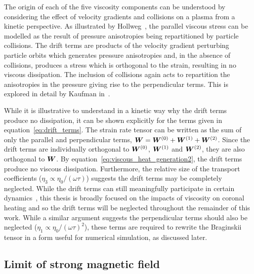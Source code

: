 The origin of each of the five viscosity components can be understood by considering the effect of velocity gradients and collisions on a plasma from a kinetic perspective. As illustrated by Hollweg~\cite{hollwegViscosityMagnetizedPlasma1985}, the parallel viscous stress can be modelled as the result of pressure anisotropies being repartitioned by particle collisions. The drift terms are products of the velocity gradient perturbing particle orbits which generates pressure anisotropies and, in the absence of collisions, produces a stress which is orthogonal to the strain, resulting in no viscous dissipation. The inclusion of collisions again acts to repartition the anisotropies in the pressure giving rise to the perpendicular terms. This is explored in detail by Kaufman in~\cite{kaufmanPlasmaViscosityMagnetic1960}.

While it is illustrative to understand in a kinetic way why the drift terms produce no dissipation, it can be shown explicitly for the terms given in equation~\ref{eq:drift_terms}. The strain rate tensor can be written as the sum of only the parallel and perpendicular terms, ${\bm W} = {\bm W}^{(0)} + {\bm W}^{(1)} + {\bm W}^{(2)}$. Since the drift terms are individually orthogonal to ${\bm W}^{(0)}$, ${\bm W}^{(1)}$ and ${\bm W}^{(2)}$, they are also orthogonal to ${\bm W}$. By equation~\ref{eq:viscous_heat_generation2}, the drift terms produce no viscous dissipation. Furthermore, the relative size of the transport coefficients ($\eta_3 \propto \eta_0/(\omega\tau)$) suggests the drift terms may be completely neglected. While the drift terms can still meaningfully participate in certain dynamics~\cite{dellarPlanarChannelFlow2011,ferraroFiniteElementImplementation2006}, this thesis is broadly focused on the impacts of viscosity on coronal heating and so the drift terms will be neglected throughout the remainder of this work. While a similar argument suggests the perpendicular terms should also be neglected ($\eta_1 \propto \eta_0/(\omega\tau)^2$), these terms are required to rewrite the Braginskii tensor in a form useful for numerical simulation, as discussed later.

\subsection{Limit of strong magnetic field}

